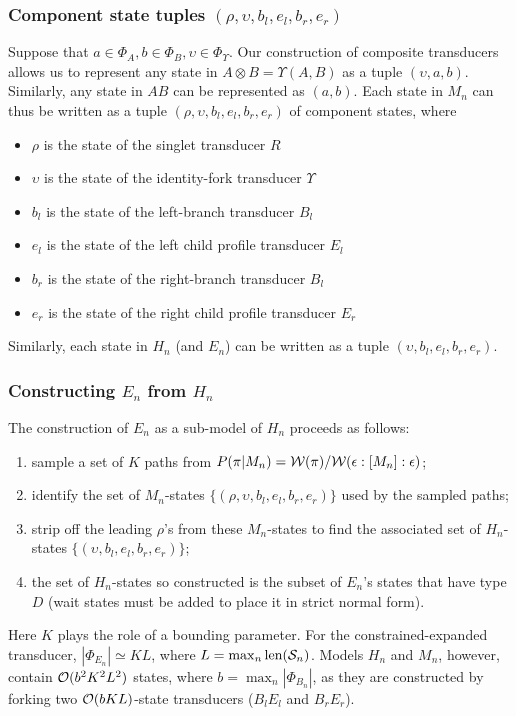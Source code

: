 \documentclass{article}
\newcommand\wtrans[4]{#1(#2 : [#3] : #4)}
\newcommand\compose{}
\newcommand\fork{\otimes}
\newcommand\idfork{\Upsilon}
\newcommand\forkn[1]{\idfork(#1)}
\newcommand\forkfun[2]{\forkn{#1, #2}}
\newcommand\States{\Phi}
\newcommand\statesof[1]{\States_{#1}}
\newcommand\weight{{\cal W}}
\newcommand\numberofstates[1]{|\statesof{#1}|}
\newcommand\seqlen[1]{\mbox{len}(#1)}
\newcommand\outputn[1]{{\cal S}_{#1}}
\newcommand\outseqlen[1]{\seqlen{\outputn{#1}}}
\newcommand\order[1]{{\cal O}(#1)}
\newcommand\hstate{(\upsilon,b_l,e_l,b_r,e_r)}
\newcommand\mstate{(\rho,\upsilon,b_l,e_l,b_r,e_r)}
\begin{document}
\subsubsection{Component state tuples $\mstate$}
Suppose that $a \in \statesof{A}, b \in \statesof{B}, \upsilon \in \statesof{\idfork}$.
Our construction of composite transducers allows us to represent any state in $A \fork B = \forkfun{A}{B}$ as a tuple $(\upsilon, a,b)$.
Similarly, any state in $A \compose B$ can be represented as $(a,b)$.
Each state in $M_n$ can thus be written as a tuple $\mstate$ of component states, where
\begin{itemize}
\item $\rho$ is the state of the singlet transducer $R$
\item $\upsilon$ is the state of the identity-fork transducer $\idfork$
\item $b_l$ is the state of the left-branch transducer $B_l$
\item $e_l$ is the state of the left child profile transducer $E_l$
\item $b_r$ is the state of the right-branch transducer $B_l$
\item $e_r$ is the state of the right child profile transducer $E_r$
\end{itemize}
Similarly, each state in $H_n$ (and $E_n$) can be written as a tuple $\hstate$.

\subsubsection{Constructing $E_n$ from $H_n$}
The construction of $E_n$ as a sub-model of $H_n$ proceeds as follows:
\begin{enumerate}
\item sample a set of $K$ paths from $P(\pi | M_n) = \weight(\pi) / \wtrans{\weight}{\epsilon}{M_n}{\epsilon}$;
\item identify the set of $M_n$-states $\{\mstate\}$ used by the sampled paths;
\item strip off the leading $\rho$'s from these $M_n$-states to find the associated set of $H_n$-states $\{\hstate\}$;
\item the set of $H_n$-states so constructed is the subset of $E_n$'s states that have type $D$ (wait states must be added to place it in strict normal form).
\end{enumerate}

Here $K$ plays the role of a bounding parameter.
For the constrained-expanded transducer, $\numberofstates{E_n} \simeq KL$, where $L = \max_n \outseqlen{n}$.
Models $H_n$ and $M_n$, however, contain $\order{b^2 K^2 L^2}$ states,
where $b = \max_n \numberofstates{B_n}$,
as they are constructed by forking two $\order{bKL}$-state transducers ($B_l \compose E_l$ and $B_r \compose E_r$).
\end{document}
